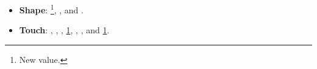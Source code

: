 \documentclass[12pt,a4paper]{article}
\begin{document}
\begin{singlespace}
\begin{itemize}
	\item \textbf{Shape}: \sfl\footnote{\label{new}New value.}, \sro, \sexor and \sexdi.
	\item \textbf{Touch}: \tfu, \tfe, \tco, \tro\cref{new}, \tbu, \tsc, \tsm and \tve\cref{new}.
\end{itemize}

\clearpage



\begin{appendix}
\end{appendix}

\end{singlespace}
\end{document}
